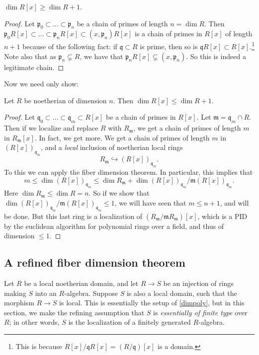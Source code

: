 \begin{lemma} 
$\dim R[x] \geq \dim R+1$.
\end{lemma} 
\begin{proof} 
Let $\mathfrak{p}_0 \subset \dots \subset \mathfrak{p}_n$ be a chain of primes of
length $n = \dim R$. Then $\mathfrak{p}_0 R[x] \subset \dots \subset
\mathfrak{p}_n R[x] \subset (x, \mathfrak{p}_n)R[x]$ is a chain of primes in
$R[x]$ of length $n+1$ because of the following fact: if $\mathfrak{q} \subset
R$ is prime, then so is $\mathfrak{q}R[x] \subset R[x]$.\footnote{This is
because $R[x]/\mathfrak{q}R[x] = (R/\mathfrak{q})[x]$ is a domain.} Note also
that as $\mathfrak{p}_n \subsetneq R$, we have that $\mathfrak{p}_n R[x]
\subsetneq (x, \mathfrak{p}_n)$. So this is indeed a legitimate chain. 
\end{proof} 

Now we need only show:
\begin{lemma} 
Let $R$ be noetherian of dimension $n$. Then $\dim R[x] \leq \dim R+1$.
\end{lemma} 
\begin{proof} 
Let $\mathfrak{q}_0 \subset \dots \subset \mathfrak{q}_m \subset R[x]$ be a chain of primes
in $R[x]$. Let $\mathfrak{m} = \mathfrak{q}_m \cap R$. Then if we localize and
replace $R$ with $R_{\mathfrak{m}}$, we get a chain of primes of length $m$ in
$R_{\mathfrak{m}}[x]$. 
In fact, we get more. We get a chain of primes of length $m$ in
$(R[x])_{\mathfrak{q}_m}$, and a \emph{local } inclusion of noetherian local rings
\[ R_{\mathfrak{m}} \hookrightarrow (R[x])_{\mathfrak{q}_m} . \]
To this we can apply the fiber dimension theorem. In particular, this implies
that
\[ m \leq \dim (R[x])_{\mathfrak{q}_m} \leq \dim R_{\mathfrak{m}} + \dim
(R[x])_{\mathfrak{q}_m} /\mathfrak{m} (R[x])_{\mathfrak{q}_m}. \]
Here $\dim R_{\mathfrak{m}} \leq \dim R = n$. So if we show that $\dim
(R[x])_{\mathfrak{q}_m} /\mathfrak{m} (R[x])_{\mathfrak{q}_m} \leq 1$, we will
have seen that $m \leq n+1$, and will be done. But this last ring is a
localization of $(R_{\mathfrak{m}}/\mathfrak{m}R_{\mathfrak{m}})[x]$, which is
a PID by the euclidean algorithm for polynomial rings over a field, and thus of
dimension  $\leq 1$.
\end{proof} 

\subsection{A refined fiber dimension theorem}

Let $R$ be a local noetherian domain, and let $R \to S$ be an injection of
rings making $S$ into an $R$-algebra. Suppose $S$ is also a local domain, such
that the morphism $R \to S$ is local. This is essentially the setup of
\cref{dimpoly}, but in this section, we make the refining assumption that $S$
is \emph{essentially of finite type} over $R$; in other words, $S$ is the
localization of a finitely generated $R$-algebra.

